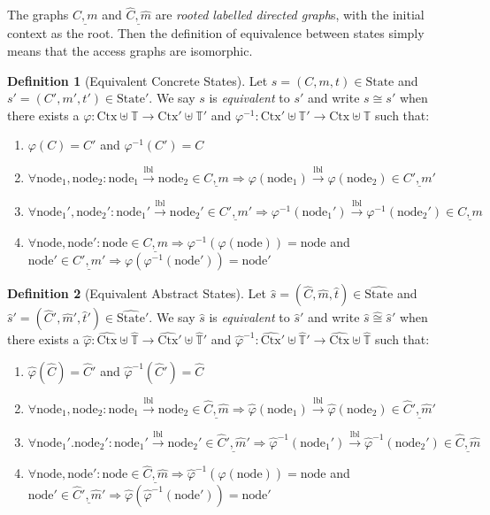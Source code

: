 \documentclass{article}
\theoremstyle{definition}
\newtheorem{definition}{Definition}[section]
\newcommand*{\A}[1]{\widehat{#1}}
\newcommand*{\Time}{\mathbb{T}}
\newcommand*{\ATime}{\A{\Time}}
\newcommand*{\Ctx}{\text{Ctx}}
\newcommand*{\mem}{m}
\newcommand*{\State}{\text{State}}
\newcommand*{\AState}{\widehat{\text{State}}}
\begin{document}
The graphs $\underline{C,m}$ and $\underline{\A{C},\A{m}}$ are \emph{rooted labelled directed graph}s, with the initial context as the root.
Then the definition of equivalence between states simply means that the access graphs are isomorphic.
\begin{definition}[Equivalent Concrete States]
  Let $s=(C,\mem,t)\in\State$ and $s'=(C',\mem',t')\in\State'$.
  We say $s$ is \emph{equivalent} to $s'$ and write $s\cong s'$ when there exists a $\varphi:\Ctx\uplus\Time\rightarrow\Ctx'\uplus\Time'$ and $\varphi^{-1}:\Ctx'\uplus\Time'\rightarrow\Ctx\uplus\Time$ such that:
  \begin{enumerate}
    \item $\varphi(C)=C'$ and $\varphi^{-1}(C')=C$
    \item $\forall\text{node}_1,\text{node}_2:\text{node}_1\xrightarrow{\text{lbl}}\text{node}_2\in\underline{C,\mem}\Rightarrow\varphi(\text{node}_1)\xrightarrow{\text{lbl}}\varphi(\text{node}_2)\in\underline{C',\mem'}$
    \item $\forall\text{node}_1',\text{node}_2':\text{node}_1'\xrightarrow{\text{lbl}}\text{node}_2'\in\underline{C',\mem'}\Rightarrow\varphi^{-1}(\text{node}_1')\xrightarrow{\text{lbl}}\varphi^{-1}(\text{node}_2')\in\underline{C,\mem}$
    \item $\forall\text{node},\text{node}':\text{node}\in\underline{C,\mem}\Rightarrow\varphi^{-1}(\varphi(\text{node}))=\text{node}$ and $\text{node}'\in\underline{C',\mem'}\Rightarrow\varphi(\varphi^{-1}(\text{node}'))=\text{node}'$
  \end{enumerate}
\end{definition}
\begin{definition}[Equivalent Abstract States]
  Let $\A{s}=(\A{C},\A\mem,\A{t})\in\AState$ and $\A{s}'=(\A{C}',\A\mem',\A{t}')\in\AState'$.
  We say $\A{s}$ is \emph{equivalent} to $\A{s}'$ and write $\A{s}\A\cong\A{s}'$ when there exists a $\A\varphi:\A\Ctx\uplus\ATime\rightarrow\A\Ctx'\uplus\ATime'$ and $\A\varphi^{-1}:\A\Ctx'\uplus\ATime'\rightarrow\A\Ctx\uplus\ATime$ such that:
  \begin{enumerate}
    \item $\A\varphi(\A{C})=\A{C}'$ and $\A\varphi^{-1}(\A{C}')=\A{C}$
    \item $\forall\text{node}_1,\text{node}_2:\text{node}_1\xrightarrow{\text{lbl}}\text{node}_2\in\underline{\A{C},\A\mem}\Rightarrow\A\varphi(\text{node}_1)\xrightarrow{\text{lbl}}\A\varphi(\text{node}_2)\in\underline{\A{C}',\A\mem'}$
    \item $\forall\text{node}_1'.\text{node}_2':\text{node}_1'\xrightarrow{\text{lbl}}\text{node}_2'\in\underline{\A{C}',\A\mem'}\Rightarrow\A\varphi^{-1}(\text{node}_1')\xrightarrow{\text{lbl}}\A\varphi^{-1}(\text{node}_2')\in\underline{\A{C},\A\mem}$
    \item $\forall\text{node},\text{node}':\text{node}\in\underline{\A{C},\A\mem}\Rightarrow\A\varphi^{-1}(\A\varphi(\text{node}))=\text{node}$ and $\text{node}'\in\underline{\A{C}',\A\mem'}\Rightarrow\A\varphi(\A\varphi^{-1}(\text{node}'))=\text{node}'$
  \end{enumerate}
\end{definition}
\end{document}
